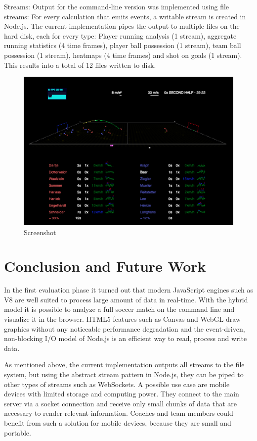 \documentclass{sig-alternate}
\begin{document}
Streams: Output for the command-line version was implemented
using file streams: For every calculation that emits events,
a writable stream is created in Node.js.
The current implementation pipes the output to multiple files
on the hard disk, each for every type:
Player running analysis (1 stream),
aggregate running statistics (4 time frames),
player ball possession (1 stream),
team ball possession (1 stream),
heatmaps (4 time frames) and shot on goals (1 stream).
This results into a total of 12 files written to disk.

\begin{figure}[t!]
  \centering
  \includegraphics[width=\linewidth]{soccer.png}
  \caption{Screenshot}
  \label{fig:screenshot}
\end{figure}

\section{Conclusion and Future Work}

In the first evaluation phase it turned out
that modern JavaScript engines such as V8
are well suited to process large amount of data in real-time.
With the hybrid model it is possible to analyze a full soccer match
on the command line and visualize it in the browser.
HTML5 features such as Canvas and WebGL draw graphics
without any noticeable performance degradation
and the event-driven, non-blocking I/O model of Node.js
is an efficient way to read, process and write data.

As mentioned above, the current implementation
outputs all streams to the file system,
but using the abstract stream pattern in Node.js,
they can be piped to other types of streams such as WebSockets.
A possible use case are mobile devices with limited storage
and computing power.
They connect to the main server via a socket connection
and receive only small chunks of data that are necessary
to render relevant information.
Coaches and team members could benefit from such a solution
for mobile devices, because they are small and portable.
\end{document}
